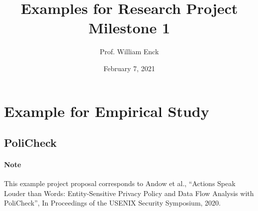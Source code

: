 \documentclass[10pt,pdftex]{article}
\title{Examples for Research Project Milestone 1}
\author{Prof. William Enck}
\date{February 7, 2021}
\begin{document}
\maketitle

\section{Example for Empirical Study}

\subsection{PoliCheck}

\paragraph{Note} 
This example project proposal corresponds to Andow et al., ``Actions Speak Louder than Words: Entity-Sensitive Privacy Policy and Data Flow Analysis with PoliCheck'', In Proceedings of the USENIX Security Symposium, 2020.
\end{document}
